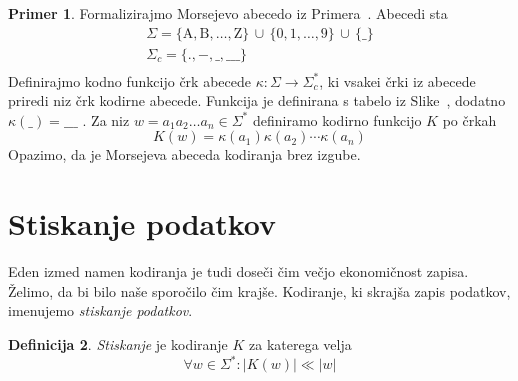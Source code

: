 \documentclass{amsart}
\theoremstyle{definition} %
\newtheorem{definicija}{Definicija}[section]
\newtheorem{primer}[definicija]{Primer}
\newtheorem{opomba}[definicija]{Opomba}
\theoremstyle{plain} %
\begin{document}
\begin{primer}
    
    Formalizirajmo Morsejevo abecedo iz Primera~. Abecedi sta
    \begin{gather*}
        \Sigma = \{ \text{A},  \text{B}, \ldots, \text{Z} \} \, \cup \, \{ 0, 1, \ldots, 9 \} \, \cup \, \{ \_ \} \\
        \Sigma_c = \{ ., -, \_, \_\_\_ \} \\
    \end{gather*}
    Definirajmo kodno funkcijo črk abecede $ \kappa \colon \Sigma \to \Sigma_c^* $, ki vsakei črki iz abecede
    priredi niz črk kodirne abecede. Funkcija je definirana s tabelo iz Slike~,
    dodatno $ \kappa(\_) = \_\_\_ $ . Za niz $ w = a_1a_2 \ldots a_n \in \Sigma^* $ definiramo kodirno 
    funkcijo $ K $ po črkah
    \[
        K(w) = \kappa(a_1)\kappa(a_2)\cdots\kappa(a_n)
    \]
    Opazimo, da je Morsejeva abeceda kodiranja brez izgube.

\end{primer}

\section{Stiskanje podatkov}

Eden izmed namen kodiranja je tudi doseči čim večjo ekonomičnost zapisa. Želimo, da bi bilo naše sporočilo
čim krajše. Kodiranje, ki skrajša zapis podatkov, imenujemo \textit{stiskanje podatkov}.

\begin{definicija}
    
    \textit{Stiskanje} je kodiranje $ K $ za katerega velja 
    \[ 
    \forall w \in \Sigma^* \colon \left\lvert K(w)\right\rvert \ll \left\lvert w \right\rvert
    \]

\end{definicija}

    

\end{document}
